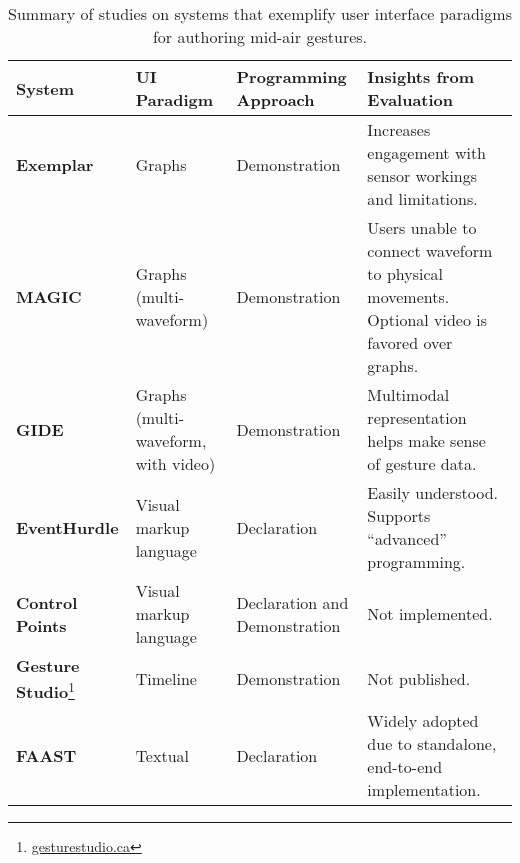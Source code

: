 \begin{table}[ht]
\centering
\renewcommand{\arraystretch}{1.8}
\begin{tabular}{>{\raggedright\arraybackslash}m{} >{\raggedright\arraybackslash}m{} >{\raggedright\arraybackslash}m{} >{\raggedright\arraybackslash}m{}}
\textbf{System} &
\textbf{UI Paradigm} &
\textbf{Programming Approach} &
\textbf{Insights from Evaluation} \\
\hline
\textbf{Exemplar} \newline
\parencite{Hartmann:2007} &
Graphs &
Demonstration &
Increases engagement with sensor workings and limitations. \\
\textbf{MAGIC} \newline
\parencite{Ashbrook:2010} &
Graphs (multi-waveform) &
Demonstration &
Users unable to connect waveform to physical movements. Optional video is favored over graphs. \\
\textbf{GIDE} \newline
\parencite{Zamborlin:2014} &
Graphs (multi-waveform, with video) &
Demonstration &
Multimodal representation helps make sense of gesture data. \\
\textbf{EventHurdle} \newline
\parencite{Kim:2013} &
Visual markup language &
Declaration &
Easily understood. Supports “advanced” programming. \\
\textbf{Control Points} \newline
\parencite{Hoste:2013} &
Visual markup language &
Declaration and Demonstration &
Not implemented. \\
\textbf{Gesture Studio}\footnote{\href{http://www.gesturestudio.ca}{gesturestudio.ca}} &
Timeline &
Demonstration &
Not published. \\
\textbf{FAAST} \newline
\parencite{Suma:2013} &
Textual &
Declaration &
Widely adopted due to standalone, end-to-end implementation. \\
\hline
\end{tabular}
\caption{Summary of studies on systems that exemplify user interface paradigms for authoring mid-air gestures.}
\label{tab:systems-summary}
\end{table}

